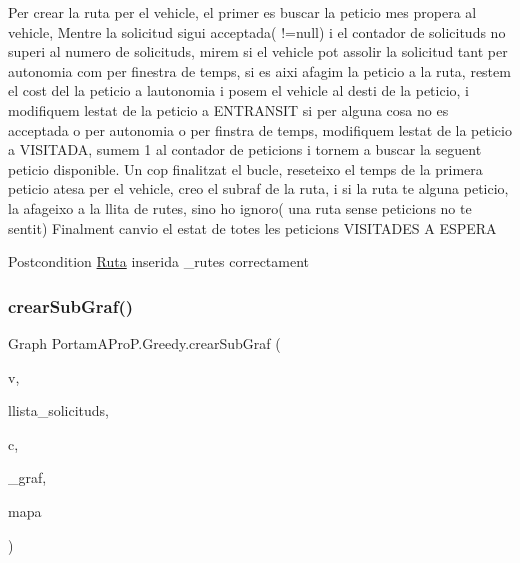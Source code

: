 Per crear la ruta per el vehicle, el primer es buscar la peticio mes propera al vehicle, Mentre la solicitud sigui acceptada( !=null) i el contador de solicituds no superi al numero de solicituds, mirem si el vehicle pot assolir la solicitud tant per autonomia com per finestra de temps, si es aixi afagim la peticio a la ruta, restem el cost del la peticio a l\textquotesingle{}autonomia i posem el vehicle al desti de la peticio, i modifiquem l\textquotesingle{}estat de la peticio a E\+N\+T\+R\+A\+N\+S\+IT si per alguna cosa no es acceptada o per autonomia o per finstra de temps, modifiquem l\textquotesingle{}estat de la peticio a V\+I\+S\+I\+T\+A\+DA, sumem 1 al contador de peticions i tornem a buscar la seguent peticio disponible. Un cop finalitzat el bucle, reseteixo el temps de la primera peticio atesa per el vehicle, creo el subraf de la ruta, i si la ruta te alguna peticio, la afageixo a la llita de rutes, sino ho ignoro( una ruta sense peticions no te sentit) Finalment canvio el estat de totes les peticions V\+I\+S\+I\+T\+A\+D\+ES A E\+S\+P\+E\+RA

\begin{DoxyPostcond}{Postcondition}
\hyperlink{class_portam_a_pro_p_1_1_ruta}{Ruta} inserida \+\_\+rutes correctament 
\end{DoxyPostcond}
\mbox{\label{class_portam_a_pro_p_1_1_greedy_ad535a1ddb039e8d8c3d9e61d3d4caee9}} 
\subsubsection{\texorpdfstring{crear\+Sub\+Graf()}{crearSubGraf()}}
{\footnotesize\ttfamily Graph Portam\+A\+Pro\+P.\+Greedy.\+crear\+Sub\+Graf (\begin{DoxyParamCaption}\item[{\hyperlink{class_portam_a_pro_p_1_1_vehicle}{Vehicle}}]{v,  }\item[{Tree\+Set$<$ \hyperlink{class_portam_a_pro_p_1_1_peticio}{Peticio} $>$}]{llista\+\_\+solicituds,  }\item[{int \mbox{[}$\,$\mbox{]}}]{c,  }\item[{Graph}]{\+\_\+graf,  }\item[{\hyperlink{class_portam_a_pro_p_1_1_llegir_fitxer_graf}{Llegir\+Fitxer\+Graf}}]{mapa }\end{DoxyParamCaption})}



